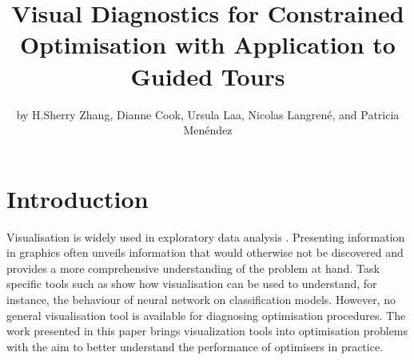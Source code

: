 \title{Visual Diagnostics for Constrained Optimisation with Application to
Guided Tours}
\author{by H.Sherry Zhang, Dianne Cook, Ursula Laa, Nicolas Langrené, and Patricia Menéndez}

\maketitle


\hypertarget{introduction}{%
\section{Introduction}\label{introduction}}

Visualisation is widely used in exploratory data analysis
\citep{tukey1977exploratory, unwin2015graphical, healy2018data, wilke2019fundamentals}.
Presenting information in graphics often unveils information that would
otherwise not be discovered and provides a more comprehensive
understanding of the problem at hand. Task specific tools such as
\citet{li2020visualizing} show how visualisation can be used to
understand, for instance, the behaviour of neural network on
classification models. However, no general visualisation tool is
available for diagnosing optimisation procedures. The work presented in
this paper brings visualization tools into optimisation problems with
the aim to better understand the performance of optimisers in practice.

